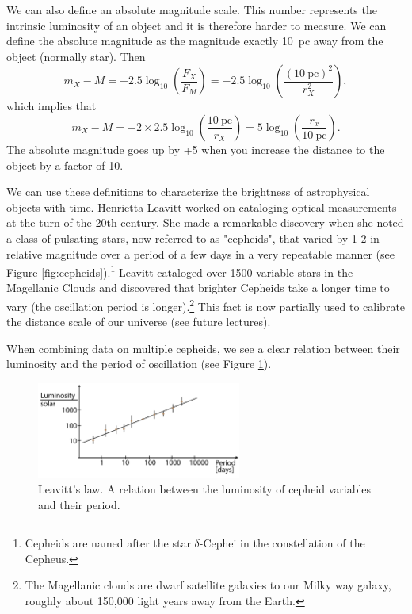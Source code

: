 \documentclass[a4paper,12pt]{article}
\theoremstyle{remark}
\newcommand{\mrm}[1]{\mathrm{#1}}
\renewcommand{\=}[1]{\stackrel{#1}{=}} %
\theoremstyle{plain}
\theoremstyle{definition}
\begin{document}
We can also define an absolute magnitude scale. This number represents the intrinsic luminosity of an object and it is therefore harder to measure. We can define the absolute magnitude as the magnitude exactly 10~pc away from the object (normally star).  Then
\begin{equation}
m_X - M = -2.5 \log _{10} \left( \frac{F_X}{F_M} \right) = -2.5 \log _{10} \left( \frac{(10 \:\mrm{pc})^{2}}{r^{2}_X} \right),
\end{equation}
which implies that
\begin{equation}
m_X - M = -2 \times 2.5 \log_{10} \left( \frac{10 \:\mrm{pc}}{r_X} \right) = 5 \log _{10} \left( \frac{r_x}{10 \: \mrm{pc}} \right).
\end{equation}
The absolute magnitude goes up by +5 when you increase the distance to the object by a factor of 10.

We can use these definitions to characterize the brightness of astrophysical objects with time. Henrietta Leavitt worked on cataloging optical measurements at the turn of the 20th century. She made a remarkable discovery when she noted a class of pulsating stars, now referred to as "cepheids", that varied by 1-2 in relative magnitude over a period of a few days in a very repeatable manner (see Figure \ref{fig:cepheids}).\footnote{Cepheids are named after the star $\delta$-Cephei in the constellation of the Cepheus.} Leavitt cataloged over 1500 variable stars in the Magellanic Clouds and discovered that brighter Cepheids take a longer time to vary (the oscillation period is longer).\footnote{The Magellanic clouds are dwarf satellite galaxies to our Milky way galaxy, roughly about 150,000 light years away from the Earth.} This fact is now partially used to calibrate the distance scale of our universe (see future lectures). %

When combining data on multiple cepheids, we see a clear relation between their luminosity and the period of oscillation (see Figure \ref{fig:lr}).

\begin{figure}[t]
\begin{center}
    \includegraphics*[angle=0,width=0.6\textwidth]{img/luminosity_relation.png}
    \caption[Insert text]{Leavitt's law. A relation between the luminosity of cepheid variables and their period.}
\label{fig:lr}
\end{center}
\end{figure}
\end{document}

